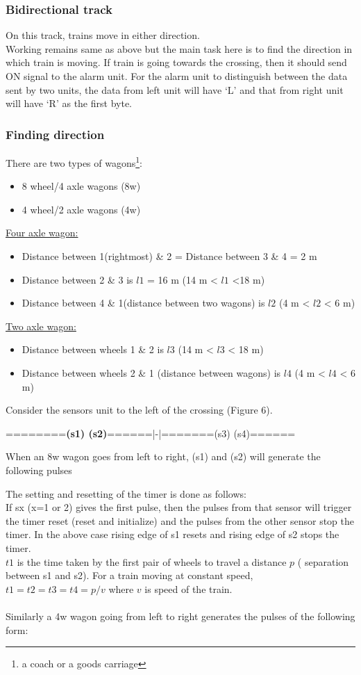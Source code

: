 \documentclass[aps,letterpaper,11pt]{article}
\begin{document}
\subsubsection{Bidirectional track}
On this track, trains move in either direction.\\
Working remains same as above but the main task here is to find the direction
in which train is moving. If train is going towards the crossing, then it
should send ON signal to the alarm unit. For the alarm unit to distinguish
between the data sent by two units, the data from left unit will
have `L' and that from right unit will have `R' as the first byte.

\newpage
\subsubsection{Finding direction}
There are two types of wagons\footnote{a coach or a goods carriage}:
\begin{itemize}
\item 8 wheel/4 axle wagons (8w)
\item 4 wheel/2 axle wagons (4w)
\end{itemize}

\underline{Four axle wagon:}
\begin{itemize}
\item Distance between 1(rightmost) \& 2 = Distance between 3 \& 4 = 2 m
\item Distance between 2 \& 3 is $l1$ = 16 m (14 m < $l1$ <18 m)
\item Distance between 4 \& 1(distance between two wagons) is $l2$ (4 m < $l2$
< 6 m)
\end{itemize}
\underline{Two axle wagon:}
\begin{itemize}
\item Distance between wheels 1 \& 2 is $l3$ (14 m < $l3$ < 18 m)
\item Distance between wheels 2 \& 1 (distance between wagons) is $l4$ (4 m <
$l4$ < 6 m)
\end{itemize}
\newpage
Consider the sensors unit to the left of the crossing (Figure 6). \\
\begin{center}
========\textbf{(s1) (s2)}======|-|=======(s3) (s4)======
\end{center}

When an 8w wagon goes from left to right, (s1) and (s2) will generate the
 following pulses


The setting and resetting of the timer is done as follows: \\
If sx (x=1 or 2) gives the first pulse, then the pulses from that sensor will
trigger the timer reset (reset and initialize) and the pulses from the other
sensor stop the timer. In the above case rising edge of s1 resets and rising
edge of s2 stops the timer. \\
$t1$ is the time taken by the first pair of wheels to travel a distance $p$ (
separation between s1 and s2). For a train moving at constant speed, $t1 = t2
= t3 = t4 = p/v$ where $v$ is speed of the train. \\ \\
Similarly a 4w wagon going from left to right generates the pulses of the
following form:
\end{document}
